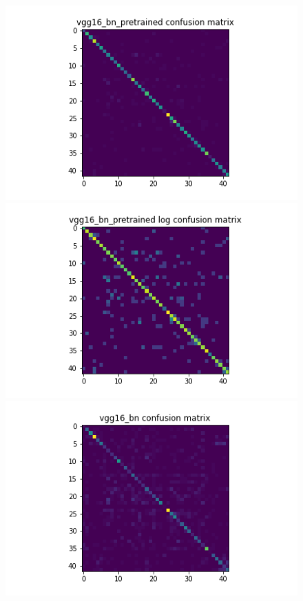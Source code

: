 \begin{figure}[t]
  \begin{minipage}[b]{.5\linewidth}
    \centering
    \includegraphics[width=1.2\textwidth]{figs/conf_matrix/vgg16_bn_pretrained_conf.png}
  \end{minipage}
  \hfill
  \begin{minipage}[b]{.5\linewidth}
    \centering
    \includegraphics[width=1.2\textwidth]{figs/conf_matrix/vgg16_bn_pretrained_log_conf.png}
  \end{minipage}
  \vfill
  \begin{minipage}[b]{.5\linewidth}
    \centering
    \includegraphics[width=1.2\textwidth]{figs/conf_matrix/vgg16_bn_conf.png}

\end{minipage}
\end{figure}
